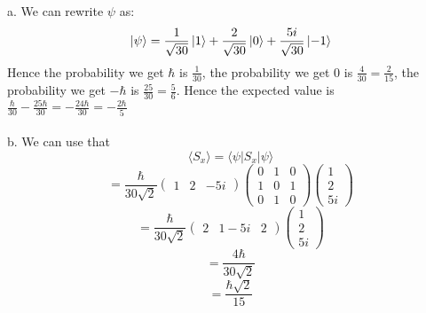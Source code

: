 \documentclass[11pt]{scrartcl}
\begin{document}
\begin{soln}
  a. We can rewrite $\psi$ as:
  $$\Ket{\psi}=\frac{1}{\sqrt{30}}\Ket{1}+\frac{2}{\sqrt{30}}\Ket{0}+\frac{5i}{\sqrt{30}}\Ket{-1}$$
  Hence the probability we get $\hbar$ is $\frac{1}{30}$, the probability we get $0$ is $\frac{4}{30}=\frac{2}{15}$, the probability we get $-\hbar$ is $\frac{25}{30}=\frac{5}{6}$.
  Hence the expected value is $\frac{\hbar}{30}-\frac{25\hbar}{30}=-\frac{24\hbar}{30}=-\frac{2\hbar}{5}$
  \\ \\
  b. We can use that
  $$\langle S_x\rangle=\langle\psi\vert S_x\vert \psi \rangle$$
  $$=\frac{\hbar}{30\sqrt{2}}\begin{pmatrix}1 & 2 & -5i\end{pmatrix}\begin{pmatrix}0 & 1 & 0 \\ 1 & 0 & 1 \\ 0 & 1 & 0\end{pmatrix}\begin{pmatrix}1 \\ 2 \\ 5i\end{pmatrix}$$
  $$=\frac{\hbar}{30\sqrt{2}}\begin{pmatrix}2 & 1-5i & 2\end{pmatrix}\begin{pmatrix} 1 \\ 2 \\ 5i\end{pmatrix}$$
  $$=\frac{4\hbar}{30\sqrt{2}}$$
  $$=\frac{\hbar\sqrt{2}}{15}$$
\end{soln}
\end{document}
